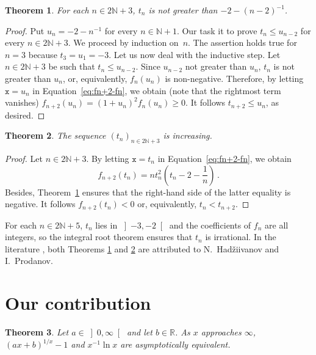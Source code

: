 \documentclass[12pt]{article}
\newcommand{\bR}{\mathbb{R}}
\newcommand{\bN}{\mathbb{N}}
\newcommand{\gtint}[1]{\left] #1, \infty \right[}
\newcommand{\ttx}{\mathtt{x}}
\newtheorem{theorem}{Theorem}
\begin{document}
 \begin{theorem} \label{thm:HP-upper}
   For each $n \in 2 \bN + 3$, $t_n$ is not greater than $- 2 - {(n - 2)}^{-1}$.
 \end{theorem}

 \begin{proof}
   Put $u_n = - 2 - n^{-1}$ for every $n \in \bN + 1$.
   Our task it to prove $t_n \le u_{n - 2}$ for every $n \in 2 \bN + 3$.
   We proceed by induction on~$n$.
   The assertion holds true for $n = 3$ because $t_3 = u_1 = - 3$.
   Let us now deal with the inductive step.
   Let $n \in 2 \bN + 3$ be such that $t_n \le u_{n - 2}$.
   Since $u_{n - 2}$ not greater than $u_n$, $t_n$ is not greater than $u_n$, or, equivalently, $f_n(u_n)$ is non-negative.
   Therefore,  
   by letting $\ttx = u_n$ in Equation~\eqref{eq:fn+2-fn}, we obtain (note that the rightmost term vanishes)
   $f_{n + 2}(u_n) = {( 1 + u_n )}^2 f_n(u_n) \ge 0$.
   It follows $t_{n + 2} \le u_n$, as desired.
 \end{proof}
 
 
 
\begin{theorem} \label{thm:HP-tn-increase} 
  The sequence $\left( t_n \right)_{n \in 2 \bN + 3}$ is increasing.
 \end{theorem} 

 \begin{proof}
 Let $n \in 2 \bN + 3$.
 By letting $\ttx = t_n$ in Equation~\eqref{eq:fn+2-fn}, we obtain
 $$ 
f_{n + 2} (t_n) = n t_n^2 \left(t_n - 2 - \frac{1}{n} \right) \, .
$$
Besides, Theorem~\ref{thm:HP-upper} ensures that the right-hand side of the latter equality is negative.
It follows $f_{n + 2} (t_n) < 0$ or, equivalently, $t_n < t_{n + 2}$.
\end{proof}

For each $n \in 2 \bN + 5$, $t_n$ lies in $\left]- 3, - 2 \right[$ and the coefficients of $f_n$ are all integers,
so the integral root theorem ensures that $t_n$ is irrational.
 In the literature \cite{MitrinovicCNIA, MitrinovicAI, MitrinovicP93, MondP94},
 both Theorems \ref{thm:HP-upper} and \ref{thm:HP-tn-increase} are attributed to N.~Had\v{z}iivanov and I.~Prodanov.

\section{Our contribution}

\begin{theorem}
  Let $a \in \gtint{0}$ and let $b \in \bR$.
 As $x$ approaches $\infty$, 
 ${(a x + b)}^{1 / x} - 1$
 and
 $x^{-1} \ln x$ are asymptotically equivalent.
\end{theorem}
\end{document}
